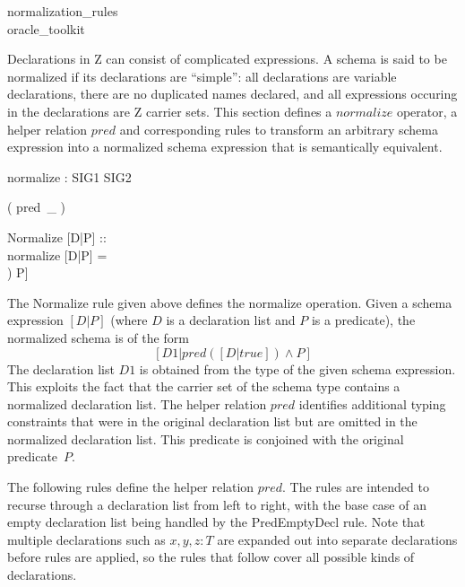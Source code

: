 \begin{zsection}
  \SECTION normalization\_rules \\ \parents oracle\_toolkit
\end{zsection}

Declarations in Z can consist of complicated expressions.  A schema is
said to be normalized if its declarations are ``simple'': all
declarations are variable declarations, there are no duplicated names
declared, and all expressions occuring in the declarations are Z
carrier sets.  This section defines a $normalize$ operator, a helper
relation $pred$ and corresponding rules to transform an arbitrary
schema expression into a normalized schema expression that is
semantically equivalent.

\begin{gendef}
  normalize : SIG1 \fun SIG2 \\
\end{gendef}

\begin{zed}
  \relation ( pred~\_ )
\end{zed}

\begin{zedrule}{Normalize}
   [D|P] :: \power [D1|true] \\
\derives
  normalize [D|P] = \\ [D1 | pred([D|true]) \land P]
\end{zedrule}

The Normalize rule given above defines the normalize operation.  Given
a schema expression $[D|P]$ (where $D$ is a declaration list and $P$
is a predicate), the normalized schema is of the form
$$[D1 | pred([D|true])\land P]$$ The declaration list $D1$ is
obtained from the type of the given schema expression.  This exploits
the fact that the carrier set of the schema type contains a normalized
declaration list.  The helper relation $pred$ identifies additional
typing constraints that were in the original declaration list but are
omitted in the normalized declaration list.  This predicate is
conjoined with the original predicate~$P$.

The following rules define the helper relation $pred$.  The rules are
intended to recurse through a declaration list from left to right,
with the base case of an empty declaration list being handled by the
PredEmptyDecl rule.  Note that multiple declarations such as $x,y,z:T$
are expanded out into separate declarations before rules are applied,
so the rules that follow cover all possible kinds of declarations.


